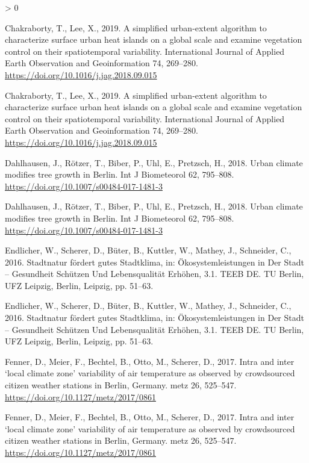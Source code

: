 \documentclass[
]{article}
\newlength{\cslhangindent}
\newenvironment{CSLReferences}[2] %
 {%
  \setlength{\parindent}{0pt}
  \ifodd #1 \everypar{\setlength{\hangindent}{\cslhangindent}}\ignorespaces\fi
  \ifnum #2 > 0
  \setlength{\parskip}{#2\baselineskip}
  \fi
 }%
 {}
\begin{document}
\begin{CSLReferences}{1}{0}
\leavevmode\hypertarget{ref-chakraborty2019}{}%
Chakraborty, T., Lee, X., 2019. A simplified urban-extent algorithm to characterize surface urban heat islands on a global scale and examine vegetation control on their spatiotemporal variability. International Journal of Applied Earth Observation and Geoinformation 74, 269--280. \url{https://doi.org/10.1016/j.jag.2018.09.015}

\leavevmode\hypertarget{ref-chakraborty2019}{}%
Chakraborty, T., Lee, X., 2019. A simplified urban-extent algorithm to characterize surface urban heat islands on a global scale and examine vegetation control on their spatiotemporal variability. International Journal of Applied Earth Observation and Geoinformation 74, 269--280. \url{https://doi.org/10.1016/j.jag.2018.09.015}

\leavevmode\hypertarget{ref-dahlhausen2018}{}%
Dahlhausen, J., Rötzer, T., Biber, P., Uhl, E., Pretzsch, H., 2018. Urban climate modifies tree growth in {Berlin}. Int J Biometeorol 62, 795--808. \url{https://doi.org/10.1007/s00484-017-1481-3}

\leavevmode\hypertarget{ref-dahlhausen2018}{}%
Dahlhausen, J., Rötzer, T., Biber, P., Uhl, E., Pretzsch, H., 2018. Urban climate modifies tree growth in {Berlin}. Int J Biometeorol 62, 795--808. \url{https://doi.org/10.1007/s00484-017-1481-3}

\leavevmode\hypertarget{ref-endlicher2016}{}%
Endlicher, W., Scherer, D., Büter, B., Kuttler, W., Mathey, J., Schneider, C., 2016. Stadtnatur fördert gutes {Stadtklima}, in: Ökosystemleistungen in Der {Stadt} -- {Gesundheit} Schützen Und {Lebensqualität} Erhöhen, 3.1. {TEEB DE. TU Berlin, UFZ Leipzig}, {Berlin, Leipzig}, pp. 51--63.

\leavevmode\hypertarget{ref-endlicher2016}{}%
Endlicher, W., Scherer, D., Büter, B., Kuttler, W., Mathey, J., Schneider, C., 2016. Stadtnatur fördert gutes {Stadtklima}, in: Ökosystemleistungen in Der {Stadt} -- {Gesundheit} Schützen Und {Lebensqualität} Erhöhen, 3.1. {TEEB DE. TU Berlin, UFZ Leipzig}, {Berlin, Leipzig}, pp. 51--63.

\leavevmode\hypertarget{ref-fenner2017}{}%
Fenner, D., Meier, F., Bechtel, B., Otto, M., Scherer, D., 2017. Intra and inter {`local climate zone'} variability of air temperature as observed by crowdsourced citizen weather stations in {Berlin}, {Germany}. metz 26, 525--547. \url{https://doi.org/10.1127/metz/2017/0861}

\leavevmode\hypertarget{ref-fenner2017}{}%
Fenner, D., Meier, F., Bechtel, B., Otto, M., Scherer, D., 2017. Intra and inter {`local climate zone'} variability of air temperature as observed by crowdsourced citizen weather stations in {Berlin}, {Germany}. metz 26, 525--547. \url{https://doi.org/10.1127/metz/2017/0861}


\end{CSLReferences}
\end{document}
